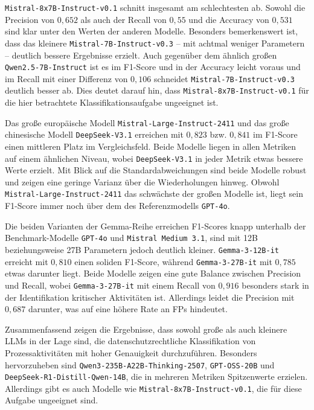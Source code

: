 \texttt{Mistral-8x7B-Instruct-v0.1} schnitt insgesamt am schlechtesten ab. Sowohl die Precision von $0{,}652$ als auch der Recall von $0{,}55$ und die Accuracy von $0{,}531$ sind klar unter den Werten der anderen Modelle. Besonders bemerkenswert ist, dass das kleinere \texttt{Mistral-7B-Instruct-v0.3} – mit achtmal weniger Parametern – deutlich bessere Ergebnisse erzielt. Auch gegenüber dem ähnlich großen \texttt{Qwen2.5-7B-Instruct} ist es im F1-Score und in der Accuracy leicht voraus und im Recall mit einer Differenz von $0{,}106$ schneidet \texttt{Mistral-7B-Instruct-v0.3} deutlich besser ab. Dies deutet darauf hin, dass \texttt{Mistral-8x7B-Instruct-v0.1} für die hier betrachtete Klassifikationsaufgabe ungeeignet ist.

Das große europäische Modell \texttt{Mistral-Large-Instruct-2411} und das große chinesische Modell \texttt{DeepSeek-V3.1} erreichen mit $0{,}823$ bzw. $0{,}841$ im F1-Score einen mittleren Platz im Vergleichsfeld. Beide Modelle liegen in allen Metriken auf einem ähnlichen Niveau, wobei \texttt{DeepSeek-V3.1} in jeder Metrik etwas bessere Werte erzielt. Mit Blick auf die Standardabweichungen sind beide Modelle robust und zeigen eine geringe Varianz über die Wiederholungen hinweg. Obwohl \texttt{Mistral-Large-Instruct-2411} das schwächste der großen Modelle ist, liegt sein F1-Score immer noch über dem des Referenzmodells \texttt{GPT-4o}.

Die beiden Varianten der Gemma-Reihe erreichen F1-Scores knapp unterhalb der Benchmark-Modelle \texttt{GPT-4o} und \texttt{Mistral Medium 3.1}, sind mit 12B beziehungsweise 27B Parametern jedoch deutlich kleiner. \texttt{Gemma-3-12B-it} erreicht mit $0{,}810$ einen soliden F1-Score, während \texttt{Gemma-3-27B-it} mit $0{,}785$ etwas darunter liegt. Beide Modelle zeigen eine gute Balance zwischen Precision und Recall, wobei \texttt{Gemma-3-27B-it} mit einem Recall von $0{,}916$ besonders stark in der Identifikation kritischer Aktivitäten ist. Allerdings leidet die Precision mit $0{,}687$ darunter, was auf eine höhere Rate an \acp{FP} hindeutet.

Zusammenfassend zeigen die Ergebnisse, dass sowohl große als auch kleinere \acp{LLM} in der Lage sind, die datenschutzrechtliche Klassifikation von Prozessaktivitäten mit hoher Genauigkeit durchzuführen. Besonders hervorzuheben sind \texttt{Qwen3-235B-A22B-Thinking-2507}, \texttt{GPT-OSS-20B} und \texttt{DeepSeek-R1-Distill-Qwen-14B}, die in mehreren Metriken Spitzenwerte erzielen. Allerdings gibt es auch Modelle wie \texttt{Mistral-8x7B-Instruct-v0.1}, die für diese Aufgabe ungeeignet sind.
